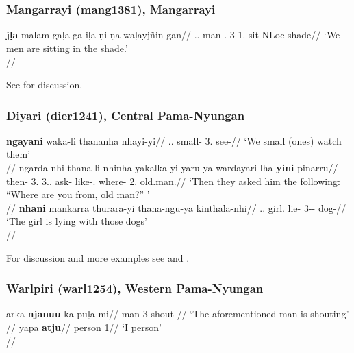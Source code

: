 \documentclass[A4paper]{article}
\begin{document}
\subsubsection{Mangarrayi (mang1381), Mangarrayi}

\ex
\begingl
\gla \textbf{\ng{}j\d{l}a} malam-ga\d{l}a ga-\ng{}i\d{l}a-\d{n}i \d{n}a-wa\d{l}ayjñin-gan//
\Pl.\Excl.\Nom{} man-\Pl.\Nom{} 3-1\Pl.\Excl-sit NLoc-shade//
\glft `We men are sitting in the shade.'\\\citep[103]{merlan1989}//
\endgl
\xe

See \citealp[103; 203]{merlan1989} for discussion.


\newpage
\subsubsection{Diyari (dier1241), Central Pama-Nyungan}


\pex 
\a \begingl
\gla \textbf{ngayani} waka-li thananha nhayi-yi//
\Pl.\Excl.\Nom{} small-\Erg{} 3\Pl.\Acc{} see-\Prs{}//
\glft `We small (ones) watch them'\\\citep[102, (106)]{austin2013}//
\endgl
\a 
\begingl
\gla ngarda-nhi thana-li nhinha yakalka-yi yaru-ya wardayari-lha \textbf{yini} pinarru//
\glb then-\Loc{} 3\Pl.\Erg{} 3\Sg.\Nf.\Acc{} ask-\Prs{} like-\Dem.\Prox{} where-\Char{} 2\Sg.\Nom{} old.man.\Nom//
\glft `Then they asked him the following: ``Where are you from, old man?'' '\\\citep[119, (175)]{austin2013}//
\endgl
\a\begingl
\gla \textbf{nhani} mankarra thurara-yi thana-ngu-ya kinthala-nhi//
\Sg.\F.\Nom{} girl.\Nom{} lie-\Prs{} 3\Pl-\Loc-\Prox{} dog-\Loc{}//
\glft `The girl is lying with those dogs'\\\citep[150, (311)]{austin2013}//
\endgl
\xe


For discussion and more examples see \citet[97f.]{austin1981} and \citep[100--103, 119, 150]{austin2013}.

\subsubsection{Warlpiri (warl1254), Western Pama-Nyungan}

\pex \a 
\begingl
\gla \ng{}arka \textbf{njanu\ng{}u} ka pu\d{l}a-mi//
\glb man 3 \Prs{} shout-\Npst{}//
\glft `The aforementioned man is shouting'\\\citep[316, (22)]{hale1973}//
\endgl
\a
\begingl
\gla yapa \textbf{\ng{}atju}//
\glb person 1\Sg{}//
\glft `I person'\\\citep[317]{hale1973}//
\endgl
\xe
\end{document}
